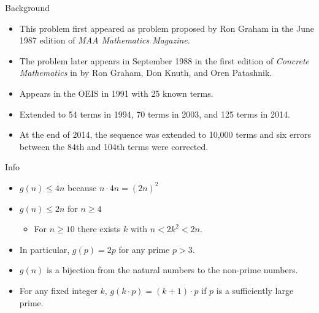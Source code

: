 \documentclass{beamer}
\begin{document}
\begin{frame}{Background}
  \begin{itemize}
    \item This problem first appeared as problem proposed by Ron Graham
          in the June 1987 edition of \textit{MAA Mathematics Magazine}.
    \item The problem later appears in September 1988 in the first edition of
      \textit{Concrete Mathematics} in by Ron Graham, Don Knuth, and Oren Patashnik.
    \item Appears in the OEIS in 1991 with 25 known terms.
    \item Extended to 54 terms in 1994, 70 terms in 2003, and 125 terms in 2014.
    \item At the end of 2014, the sequence was extended to 10,000 terms
          and six errors between the 84th and 104th terms were corrected.
  \end{itemize}
\end{frame}

\begin{frame}{Info}
  \begin{itemize}
    \item $g(n) \leq 4n$ because $n \cdot 4n = (2n)^2$
    \item $g(n) \leq 2n$ for $n \geq 4$
      \begin{itemize}
        \item For $n \geq 10$ there exists $k$ with $n < 2k^2 < 2n$.
      \end{itemize}
    \item In particular, $g(p) = 2p$ for any prime $p > 3$.
    \item $g(n)$ is a bijection from the natural numbers to the non-prime numbers.
    \item For any fixed integer $k$, $g(k\cdot p) = (k + 1)\cdot p$ if $p$ is a
      sufficiently large prime.
  \end{itemize}
\end{frame}
\end{document}
